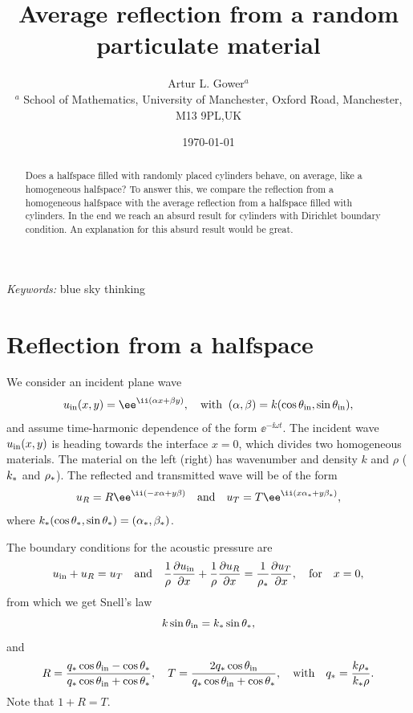 \documentclass[ 12pt, a4paper]{article}
\begin{document}
\title{Average reflection from a random particulate material}
\author{
Artur L. Gower$^{a}$ \\[12pt]
\footnotesize{$^{a}$ School of Mathematics, University of Manchester, Oxford Road, Manchester, M13 9PL,UK}\\
}
\date{\today}
\maketitle

\begin{abstract}
Does a halfspace filled with randomly placed cylinders behave, on average, like a homogeneous halfspace? To answer this, we compare the reflection from a homogeneous halfspace with the average reflection from a halfspace filled with cylinders. In the end we reach an absurd result for cylinders with Dirichlet boundary condition. An explanation for this absurd result would be great.
\end{abstract}

\noindent
{\textit{Keywords:} blue sky thinking}

\section{Reflection from a halfspace}

We consider an incident plane wave
\[
u_\inc(x,y) = \ee^{\ii (\alpha x + \beta y)}, \quad \text{with} \;\; (\alpha,\beta) = k ( \cos \theta_\inc,  \sin \theta_\inc),
\]
and assume time-harmonic dependence of the form $\ee^{-\ii \omega t}$. The incident wave $u_{\mathrm{in}}(x,y)$ is heading towards the interface $ x=0$, which divides two homogeneous materials. The material on the left (right) has wavenumber and density $k$ and $\rho$ ($k_*$ and $\rho_*$). The reflected and transmitted wave will be of the form
\[
u_R = R \ee^{\ii ( - x \alpha + y \beta)} \quad \text{and} \quad
u_T = T \ee^{\ii (x \alpha_\eff + y \beta_\eff)},
\]
where $k_*(\cos \theta_*,\sin \theta_*) = ( \alpha_*, \beta_*)$.

The boundary conditions for the acoustic pressure are
\[
u_{\mathrm{in}} + u_R = u_T \quad \text{and} \quad  \frac{1}{\rho}\frac{\partial u_{\mathrm{in}}}{\partial x} + \frac{1}{\rho}\frac{\partial u_R}{\partial x} = \frac{1}{\rho_*}\frac{\partial u_T}{\partial x}, \quad \text{for} \quad x=0,
\]
from which we get Snell's law
\begin{equation}
k \sin \theta_{\mathrm{in}} = k_* \sin \theta_*,
\label{eqn:Snells}
\end{equation}
and
\begin{equation}
  R = \frac{q_* \cos \theta_{\mathrm{in}} - \cos \theta_*}{q_* \cos \theta_{\mathrm{in}} + \cos \theta_*}, \quad 
  T = \frac{2q_* \cos \theta_{\mathrm{in}}}{q_* \cos \theta_{\mathrm{in}} + \cos \theta_*},
  \quad \text{with} \quad q_* = \frac{k \rho_*}{k_* \rho}.
  \label{eqn:Reflection}
\end{equation}
Note that $1 + R = T$.
\end{document}
